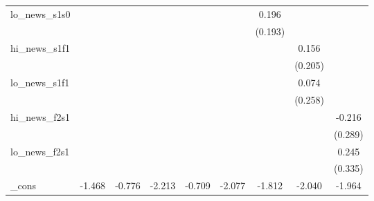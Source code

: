 {\begin{tabular}{l*{8}{c}}
\addlinespace
lo\_news\_s1s0&                     &                     &                     &                     &                     &       0.196         &                     &                     \\
            &                     &                     &                     &                     &                     &     (0.193)         &                     &                     \\
\addlinespace
hi\_news\_s1f1&                     &                     &                     &                     &                     &                     &       0.156         &                     \\
            &                     &                     &                     &                     &                     &                     &     (0.205)         &                     \\
\addlinespace
lo\_news\_s1f1&                     &                     &                     &                     &                     &                     &       0.074         &                     \\
            &                     &                     &                     &                     &                     &                     &     (0.258)         &                     \\
\addlinespace
hi\_news\_f2s1&                     &                     &                     &                     &                     &                     &                     &      -0.216         \\
            &                     &                     &                     &                     &                     &                     &                     &     (0.289)         \\
\addlinespace
lo\_news\_f2s1&                     &                     &                     &                     &                     &                     &                     &       0.245         \\
            &                     &                     &                     &                     &                     &                     &                     &     (0.335)         \\
\addlinespace
\_cons      &      -1.468\sym{**} &      -0.776         &      -2.213\sym{***}&      -0.709         &      -2.077\sym{***}&      -1.812\sym{***}&      -2.040\sym{***}&      -1.964\sym{***}\\

\end{tabular}}
